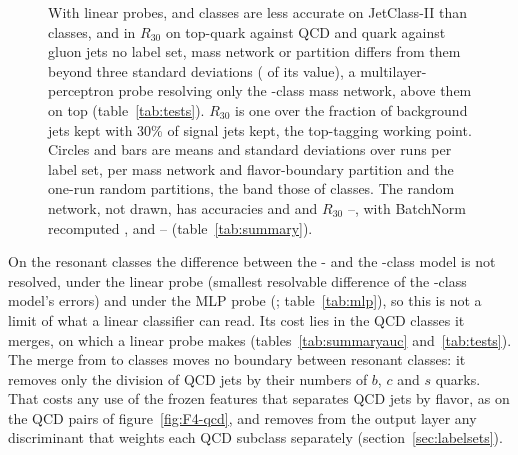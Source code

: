 \begin{figure}[t]
\centering
{}
\caption{With linear probes, \Kmid{} and \Kcoarse{} classes are less accurate on JetClass-II than \Kfull{} classes,
and in $R_{30}$ on top-quark against QCD and quark against gluon jets no label set, mass network or partition differs
from them beyond three standard deviations (\MlstPwRthirtyLp{} of its value), a multilayer-perceptron probe resolving only the
\Kcoarse-class mass network, above them on top (table~\ref{tab:tests}).
$R_{30}$ is one over the fraction of background jets kept with 30\% of signal jets kept, the top-tagging working
point. Circles and bars are means and standard deviations over \MlstNRunsWord{} runs per label set,
\MlstMassNRunsWord{} per mass network and flavor-boundary partition and the \RandVtwoNPartitions{} one-run random
partitions, the band those of \Kfull{} classes. The random network, not drawn,
has accuracies \MlstFTwoInitAccJcTwo{} and \MlstFTwoInitAccJcOne{} and $R_{30}$
\MlstFTwoInitRthirtyMin{}--\MlstFTwoInitRthirtyMax{}, with BatchNorm recomputed \MlstFTwoInitBnAccJcTwo{},
\MlstFTwoInitBnAccJcOne{} and \MlstFTwoInitBnRthirtyMin{}--\MlstFTwoInitBnRthirtyMax{} (table~\ref{tab:summary}).}
\label{fig:F2}
\end{figure}



On the resonant classes the difference between the \Kres- and the \Kfull-class model is not resolved, under the
linear probe (smallest resolvable difference \MlstPwResonantRes{} of the \Kfull-class model's errors) and under the
MLP probe (\MlstMlpCmpJcTwoResResOverFullPr{};
table~\ref{tab:mlp}), so this is not a limit of what a linear classifier can read. Its cost lies in the QCD classes it
merges, on which a linear probe makes \MlstCmpJcTwoQcdResOverFullPr{} (tables~\ref{tab:summaryauc}
and~\ref{tab:tests}). The merge from \Kfull{} to \Kres{} classes moves no boundary between resonant classes: it
removes only the division of QCD jets by their numbers of $b$, $c$ and $s$ quarks. That costs any use of the
frozen features that separates QCD jets by flavor, as on the QCD pairs of figure~\ref{fig:F4-qcd}, and removes
from the output layer any discriminant that weights each QCD subclass separately
(section~\ref{sec:labelsets}).

